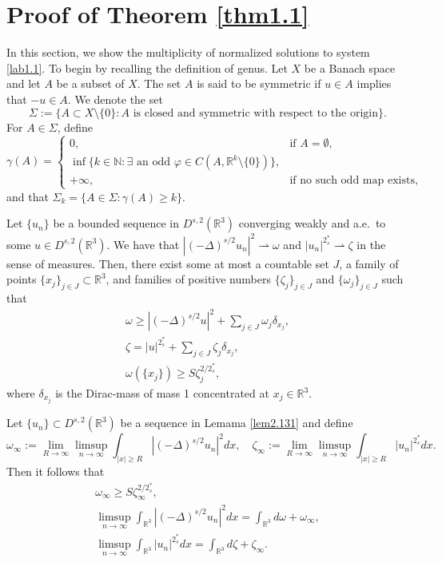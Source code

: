 \documentclass[reqno]{amsart}
\begin{document}
\section{Proof of Theorem \ref{thm1.1}}
In this section, we show the multiplicity of normalized solutions to  system \eqref{lab1.1}.
To begin by recalling the definition of genus.
Let $X$ be a Banach space and let $A$ be a subset of $X$. The set $A$ is said to be
symmetric if $u\in A$ implies that $-u\in A$. We denote the set
$$
\Sigma :=\{A\subset X\setminus \{0\}: A \text{ is closed and symmetric with respect
 to the origin}\}.
$$
For $A\in\Sigma$, define
\[
\gamma(A) =
\begin{cases}
0, & \text{if } A = \emptyset, \\
\inf\{k \in \mathbb{N}: \exists \text{ an odd }
\varphi \in C(A, \mathbb{R}^k \setminus \{0\})\}, \\
+\infty,& \text{if no such odd map exists,}
\end{cases}
\]
and that $\Sigma_k=\{A\in \Sigma:\gamma(A)\geq k\}$.

\begin{lemma}[\cite{Z1688}] \label{lem2.131}
Let $\{u_n\}$ be a bounded sequence in $D^{s,2}(\mathbb{R}^3)$ converging weakly
and a.e.\ to some $u\in D^{s,2}(\mathbb{R}^3)$.
 We have that $|(-\Delta)^{s/2}u_n|^2\rightharpoonup \omega$ and
 $|u_n|^{2^*_s}\rightharpoonup \zeta$ in the sense of measures.
Then, there exist some at most a countable set $J$, a family of points
$\{x_j\}_{j\in J} \subset \mathbb{R}^3$, and families of positive numbers
$\{\zeta_j\}_{j\in J}$ and $\{\omega_j\}_{j\in J}$ such that
\begin{gather}\label{lab3.11}
\omega \geq |(-\Delta)^{s/2}u|^2+\sum_{j\in J}\omega_j\delta_{x_j}, \\
\label{lab3.12}
\zeta=|u|^{2^*_s}+\sum_{j\in J}\zeta_j\delta_{x_j}, \\
\label{lab3.13}
\omega(\{x_j\})\geq S\zeta^{2/2^*_s}_j,
\end{gather}
where $\delta_{x_j}$ is the Dirac-mass of mass 1 concentrated at
$x_j\in {\mathbb{R}^3}$.
\end{lemma}


\begin{lemma}[\cite{Z1688}] \label{lem2.11}
Let $\{u_n\}\subset D^{s,2}(\mathbb{R}^3)$ be a sequence in Lemama \ref{lem2.131}
and define
\[
\omega_\infty:={\lim_{R\to \infty}}\limsup_{n\to\infty}
\int_{|x|\geq R} |(-\Delta)^{s/2}u_n|^2dx , \quad
\zeta_\infty:={\lim_{R\to \infty}}\limsup_{n\to\infty}
\int_{|x|\geq R} |u_n|^{2^*_s}dx.
\]
Then it follows that
\begin{gather*}%
\omega_\infty \geq S\zeta^{2/2^*_s}_\infty, \\
\limsup_{n\to\infty} \int_{\mathbb{R}^3}|(-\Delta)^{s/2}u_n|^2dx
=\int_{\mathbb{R}^3}d\omega +\omega_\infty,\\
\limsup_{n\to\infty} \int_{\mathbb{R}^3}|u_n|^{2^*_s}dx=\int_{\mathbb{R}^3}d\zeta +\zeta_\infty.\\
\end{gather*}
\end{lemma}
\end{document}
